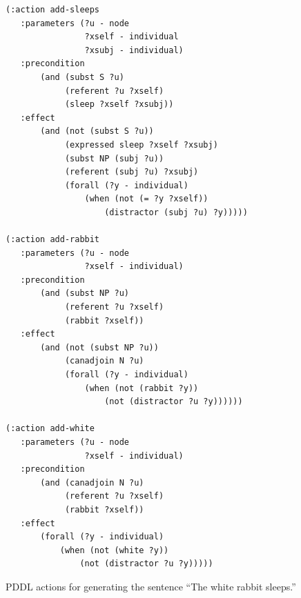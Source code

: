 \begin{figure}
\centering
\begin{minipage}{0.5\textwidth}
{\small%
\begin{verbatim}
(:action add-sleeps
   :parameters (?u - node
                ?xself - individual
                ?xsubj - individual)
   :precondition
       (and (subst S ?u)
            (referent ?u ?xself)
            (sleep ?xself ?xsubj))
   :effect 
       (and (not (subst S ?u))
            (expressed sleep ?xself ?xsubj)
            (subst NP (subj ?u))
            (referent (subj ?u) ?xsubj)
            (forall (?y - individual)
                (when (not (= ?y ?xself))
                    (distractor (subj ?u) ?y)))))

(:action add-rabbit
   :parameters (?u - node
                ?xself - individual)
   :precondition 
       (and (subst NP ?u)
            (referent ?u ?xself)
            (rabbit ?xself))
   :effect 
       (and (not (subst NP ?u))
            (canadjoin N ?u)
            (forall (?y - individual)
                (when (not (rabbit ?y))
                    (not (distractor ?u ?y))))))

(:action add-white
   :parameters (?u - node
                ?xself - individual)
   :precondition 
       (and (canadjoin N ?u)
            (referent ?u ?xself)
            (rabbit ?xself))
   :effect 
       (forall (?y - individual)
           (when (not (white ?y))
               (not (distractor ?u ?y)))))
\end{verbatim}}%
\end{minipage}
\caption{PDDL actions for generating the sentence ``The white rabbit
sleeps.''}
\label{fig:white-rabbit-as-planning}
\end{figure}

